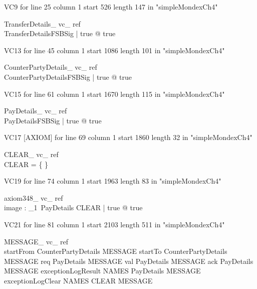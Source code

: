 \documentclass{article}
\begin{document}
VC9 for line 25 column 1 start 526 length 147 in "simpleMondexCh4"
\begin{theorem}{ TransferDetails\_ vc\_ ref}\\
 \exists TransferDetailsFSBSig | true @ true \\

\end{theorem}

VC13 for line 45 column 1 start 1086 length 101 in "simpleMondexCh4"
\begin{theorem}{ CounterPartyDetails\_ vc\_ ref}\\
 \exists CounterPartyDetailsFSBSig | true @ true \\

\end{theorem}

VC15 for line 61 column 1 start 1670 length 115 in "simpleMondexCh4"
\begin{theorem}{ PayDetails\_ vc\_ ref}\\
 \exists PayDetailsFSBSig | true @ true \\

\end{theorem}

VC17 [AXIOM] for line 69 column 1 start 1860 length 32 in "simpleMondexCh4"
\begin{theorem}{ CLEAR\_ vc\_ ref}\\
 \lnot CLEAR = \{ \} \\

\end{theorem}

VC19 for line 74 column 1 start 1963 length 83 in "simpleMondexCh4"
\begin{theorem}{ axiom348\_ vc\_ ref}\\
 \exists image : {\power}_{1}~PayDetails \inj CLEAR | true @ true \\

\end{theorem}

VC21 for line 81 column 1 start 2103 length 511 in "simpleMondexCh4"
\begin{theorem}{ MESSAGE\_ vc\_ ref}\\
 startFrom \in CounterPartyDetails \inj MESSAGE \land startTo \in CounterPartyDetails \inj MESSAGE \land req \in PayDetails \inj MESSAGE \land val \in PayDetails \inj MESSAGE \land ack \in PayDetails \inj MESSAGE \land exceptionLogResult \in NAMES \cross PayDetails \inj MESSAGE \land exceptionLogClear \in NAMES \cross CLEAR \inj MESSAGE \\

\end{theorem}
\end{document}
